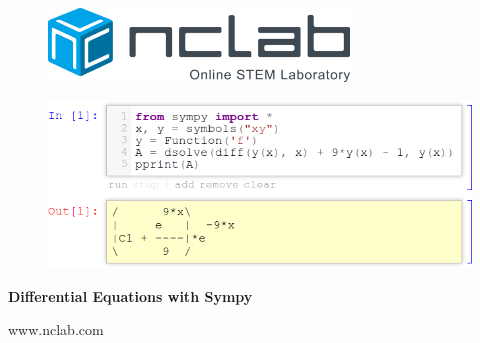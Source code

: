 \documentclass{article}
\begin{document}
\large

\vbox{}
\begin{figure}[!ht]
\includegraphics[width=8cm]{img/logo.png}
\vspace{29mm}
\end{figure}

\begin{figure}[!ht]
\begin{center}
\hspace{-20mm}
\includegraphics[width=14cm]{img/intro-frontpage.png}
\vspace{34mm}
\end{center}
\end{figure}

\centerline{\Huge \bf Differential Equations with Sympy}

\vfill

\centerline{\Large www.nclab.com}

\newpage




\section*{}

\end{document}
